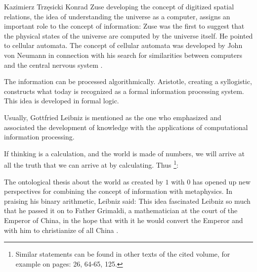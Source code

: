 \begin{artengenv}{Kazimierz Trzęsicki}
Konrad Zuse \parencite*[p.5]{Zuse2012a} developing the concept of digitized spatial relations, the idea of understanding the universe as a computer, assigns an important role to the concept of information:  Zuse was the first to suggest that the physical states of the universe are computed by the universe itself. He pointed to cellular automata. The concept of cellular automata was developed by John von Neumann in connection with his search for similarities between computers and the central nervous system \parencite{vonNeumann1951,vonNeumann1958,vonNeumann2012, Neumann1966,Shannon1958}.

The information can be processed algorithmically. Aristotle, creating a syllogistic, constructs what  today is recognized as a formal information processing system. This idea is developed in formal logic.



Usually, Gottfried Leibniz is mentioned as the one who emphasized and associated the development of knowledge with the applications of computational information processing.

If thinking is a calculation, and the world is made of numbers, we will arrive at all the truth that we can arrive at by calculating. Thus \parencite[p.200]{Leibniz1890}\footnote{Similar statements can be found in other texts of the cited volume, for example on pages: 26, 64-65, 125.}: 

The ontological thesis about the world as created by $1$ with $0$ has opened up new perspectives for combining the concept of information with metaphysics. In praising his binary arithmetic, Leibniz \parencite*{Leibniz1990} said: 
This idea fascinated Leibniz so much that he passed it on to Father Grimaldi, a mathematician at the court of the Emperor of China, in the hope that with it he would convert the Emperor and with him to christianize of all China \parencite{list1697}.


\end{artengenv}
